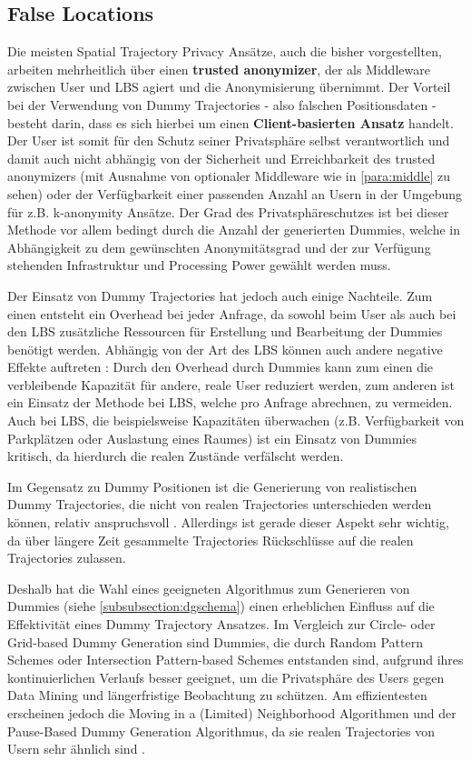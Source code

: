 \subsection{False Locations}
Die meisten Spatial Trajectory Privacy Ansätze, auch die bisher vorgestellten, arbeiten mehrheitlich über einen \textbf{trusted anonymizer}, der als Middleware zwischen User und LBS agiert und die Anonymisierung übernimmt. Der Vorteil bei der Verwendung von Dummy Trajectories - also falschen Positionsdaten - besteht darin, dass es sich hierbei um einen \textbf{Client-basierten Ansatz} handelt. Der User ist somit für den Schutz seiner Privatsphäre selbst verantwortlich und damit auch nicht abhängig von der Sicherheit und Erreichbarkeit des trusted anonymizers (mit Ausnahme von optionaler Middleware wie in \ref{para:middle} zu sehen) oder der Verfügbarkeit einer passenden Anzahl an Usern in der Umgebung für z.B. k-anonymity Ansätze. Der Grad des Privatsphäreschutzes ist bei dieser Methode vor allem bedingt durch die Anzahl der generierten Dummies, welche in Abhängigkeit zu dem gewünschten Anonymitätsgrad und der zur Verfügung stehenden Infrastruktur und Processing Power gewählt werden muss.

Der Einsatz von Dummy Trajectories hat jedoch auch einige Nachteile. Zum einen entsteht ein Overhead bei jeder Anfrage, da sowohl beim User als auch bei den LBS zusätzliche Ressourcen für Erstellung und Bearbeitung der Dummies benötigt werden. Abhängig von der Art des LBS können auch andere negative Effekte auftreten \cite{Beresford2005}: Durch den Overhead durch Dummies kann zum einen die verbleibende Kapazität für andere, reale User reduziert werden, zum anderen ist ein Einsatz der Methode bei LBS, welche pro Anfrage abrechnen, zu vermeiden. Auch bei LBS, die beispielsweise Kapazitäten überwachen (z.B. Verfügbarkeit von Parkplätzen oder Auslastung eines Raumes) ist ein Einsatz von Dummies kritisch, da hierdurch die realen Zustände verfälscht werden.

Im Gegensatz zu Dummy Positionen ist die Generierung von realistischen Dummy Trajectories, die nicht von realen Trajectories unterschieden werden können, relativ anspruchsvoll \cite{Beresford2003}. Allerdings ist gerade dieser Aspekt sehr wichtig, da über längere Zeit gesammelte Trajectories Rückschlüsse auf die realen Trajectories zulassen. 

Deshalb hat die Wahl eines geeigneten Algorithmus zum Generieren von Dummies (siehe \ref{subsubsection:dgschema}) einen erheblichen Einfluss auf die Effektivität eines Dummy Trajectory Ansatzes. Im Vergleich zur Circle- oder Grid-based Dummy Generation sind Dummies, die durch Random Pattern Schemes oder Intersection Pattern-based Schemes entstanden sind, aufgrund ihres kontinuierlichen Verlaufs besser geeignet, um die Privatsphäre des Users gegen Data Mining und längerfristige Beobachtung zu schützen. Am effizientesten erscheinen jedoch die Moving in a (Limited) Neighborhood Algorithmen und der Pause-Based Dummy Generation Algorithmus, da sie realen Trajectories von Usern sehr ähnlich sind \cite{Kukkapalli2012}. 

